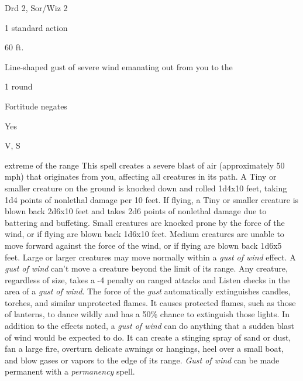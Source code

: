 
\begin{description*}
\item[Level:] Drd 2, Sor/Wiz 2
\item[Casting Time:] 1 standard action
\item[Range:] 60 ft.
\item[Effect:] Line-shaped gust of severe wind emanating out from you to the
\item[Duration:] 1 round
\item[Saving Throw:] Fortitude negates
\item[Spell Resistance:] Yes
\item[Components:] V, S
\end{description*}

extreme of the range
This spell creates a severe blast of air (approximately 50 mph) that originates
from you, affecting all creatures in its path.
A Tiny or smaller creature on the ground is knocked down and rolled 1d4x10 feet,
taking 1d4 points of nonlethal damage per 10 feet. If flying, a Tiny or smaller
creature is blown back 2d6x10 feet and takes 2d6 points of nonlethal damage due
to battering and buffeting.
Small creatures are knocked prone by the force of the wind, or if flying are blown
back 1d6x10 feet.
Medium creatures are unable to move forward against the force of the wind, or if
flying are blown back 1d6x5 feet.
Large or larger creatures may move normally within a \textit{gust of wind} effect.
A \textit{gust of wind} can't move a creature beyond the limit of its range.
Any creature, regardless of size, takes a -4 penalty on ranged attacks and Listen
checks in the area of a \textit{gust of wind}.
The force of the \textit{gust} automatically extinguishes candles, torches, and
similar unprotected flames. It causes protected flames, such as those of lanterns,
to dance wildly and has a 50\% chance to extinguish those lights.
In addition to the effects noted, a \textit{gust of wind} can do anything that
a sudden blast of wind would be expected to do. It can create a stinging spray
of sand or dust, fan a large fire, overturn delicate awnings or hangings, heel
over a small boat, and blow gases or vapors to the edge of its range.
\textit{Gust of wind} can be made permanent with a \textit{permanency} spell.